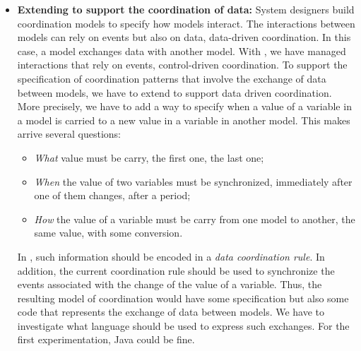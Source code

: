 \begin{itemize}
	\item \textbf{Extending \bcool to support the coordination of data:} System designers build coordination models to specify how models interact. The interactions between models can rely on events but also on data, \ie data-driven coordination. In this case, a model exchanges data with another model. With \bcool, we have managed interactions that rely on events, \ie control-driven coordination. To support the specification of coordination patterns that involve the exchange of data between models, we have to extend \bcool to support data driven coordination. More precisely, we have to add a way to specify when a value of a variable in a model is carried to a new value in a variable in another model. This makes arrive several questions:
			\begin{itemize}
				\item \emph{What} value must be carry, \eg the first one, the last one;
				\item \emph{When} the value of two variables must be synchronized, \eg immediately after one of them changes, after a period;
				\item \emph{How} the value of a variable must be carry from one model to another, \eg the same value, with some conversion. 
			\end{itemize}
			
	In \bcool, such information should be encoded in a \emph{data coordination rule}. In addition, the current coordination rule should be used to synchronize the events associated with the change of the value of a variable. Thus, the resulting model of coordination would have some \ccsl specification but also some code that represents the exchange of data between models. We have to investigate what language should be used to express such exchanges. For the first experimentation, Java could be fine. 
	   	 

\end{itemize}
